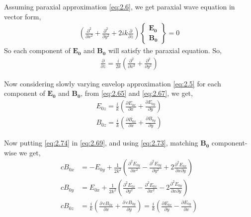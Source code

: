\documentclass[11pt,a4paper]{article}
\numberwithin{equation}{section}
\begin{document}
Assuming paraxial approximation \ref{eq:2.6}, we get paraxial wave equation in vector form, 
\begin{align}
	\left(\frac{\partial^2}{\partial x^2}+\frac{\partial^2}{\partial y^2} + 2ik\frac{\partial}{\partial z}\right)
	\begin{Bmatrix}
		\boldsymbol{E_0}\\\boldsymbol{B_0}
	\end{Bmatrix}
	=0 \label{eq:2.72}
\end{align}
So each component of $\boldsymbol{E_0}$ and $\boldsymbol{B_0}$ will satisfy the paraxial equation. So,
\begin{align}
	\frac{\partial}{\partial z}= \frac{i}{2k}\left( \frac{\partial^2}{\partial x^2}+\frac{\partial^2}{\partial y^2}  \right) \label{eq:2.73}
\end{align}


Now considering slowly varying envelop approximation \ref{eq:2.5} for each component of $\boldsymbol{E_0}$ and $\boldsymbol{B_0}$, from \ref{eq:2.65} and \ref{eq:2.67}, we get,
\begin{align} 
	E_{0z} = \frac{i}{k}\left(\frac{\partial E_{0x}}{\partial x}+\frac{\partial E_{0y}}{\partial y}\right)\label{eq:2.74}\\
	B_{0z} = \frac{i}{k}\left(\frac{\partial B_{0x}}{\partial x}+\frac{\partial B_{0y}}{\partial y}\right)\label{eq:2.75}
\end{align}

Now putting \ref{eq:2.74} in \ref{eq:2.69}, and using \ref{eq:2.73}, matching $\boldsymbol{B_0}$ component-wise we get,
\begin{align}
	cB_{0x} &= 
	-E_{0y} + \frac{1}{2k^2}\left( \frac{\partial^2 E_{0y}}{\partial x^2} - \frac{\partial^2 E_{0y}}{\partial y^2} + 2\frac{\partial^2 E_{0x}}{\partial x\partial y} \right)\label{eq:2.76}\\
	cB_{0y} &= 
	E_{0x} + \frac{1}{2k^2}\left( \frac{\partial^2 E_{0x}}{\partial y^2} - \frac{\partial^2 E_{0x}}{\partial x^2} - 2\frac{\partial^2 E_{0y}}{\partial x\partial y} \right)\\
	cB_{0z} &= 
	\frac{i}{k}\left(\frac{\partial\: cB_{0x}}{\partial x}+\frac{\partial\: cB_{0y}}{\partial y}\right)= \frac{i}{k}\left(\frac{\partial E_{0x}}{\partial y}-\frac{\partial E_{0y}}{\partial x}\right)
\end{align}
\end{document}
